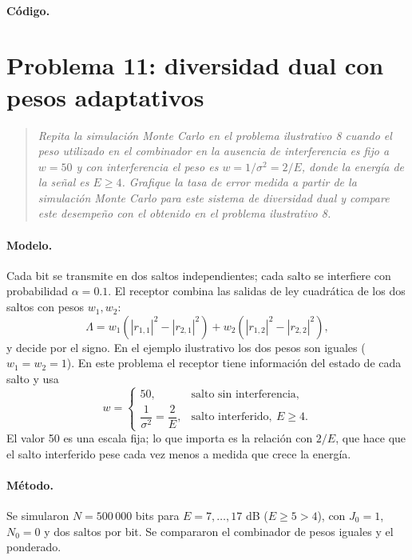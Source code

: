 \documentclass[11pt,a4paper]{article}
\newcommand{\listado}[1]{%
  \VerbatimInput[fontsize=\scriptsize,breaklines=true,breakanywhere=true,
    frame=single,framesep=2pt,rulecolor=\color{gray!50},numbers=left,
    numbersep=4pt]{#1}}
\begin{document}
\paragraph{Código.}
\listado{problema10.m}

\section{Problema 11: diversidad dual con pesos adaptativos}

\begin{quote}
\itshape
Repita la simulación Monte Carlo en el problema ilustrativo 8 cuando el peso
utilizado en el combinador en la ausencia de interferencia es fijo a $w=50$ y con
interferencia el peso es $w=1/\sigma^2=2/E$, donde la energía de la señal es
$E\ge4$. Grafique la tasa de error medida a partir de la simulación Monte Carlo
para este sistema de diversidad dual y compare este desempeño con el obtenido en
el problema ilustrativo 8.
\end{quote}

\paragraph{Modelo.} Cada bit se transmite en dos saltos independientes; cada
salto se interfiere con probabilidad $\alpha=0.1$. El receptor combina las
salidas de ley cuadrática de los dos saltos con pesos $w_1,w_2$:
\begin{equation}
  \Lambda=w_1\left(|r_{1,1}|^2-|r_{2,1}|^2\right)
         +w_2\left(|r_{1,2}|^2-|r_{2,2}|^2\right),
\end{equation}
y decide por el signo. En el ejemplo ilustrativo los dos pesos son iguales
($w_1=w_2=1$). En este problema el receptor tiene información del estado de cada
salto y usa
\begin{equation}
  w=\begin{cases}
    50, & \text{salto sin interferencia},\\[2pt]
    \dfrac{1}{\sigma^2}=\dfrac{2}{E}, & \text{salto interferido},\ E\ge4.
  \end{cases}
\end{equation}
El valor 50 es una escala fija; lo que importa es la relación con $2/E$, que
hace que el salto interferido pese cada vez menos a medida que crece la energía.

\paragraph{Método.} Se simularon $N=500\,000$ bits para $E=7,\dots,17$ dB
($E\ge5>4$), con $J_0=1$, $N_0=0$ y dos saltos por bit. Se compararon el
combinador de pesos iguales y el ponderado.
\end{document}
